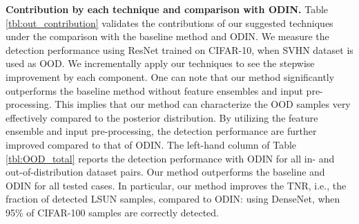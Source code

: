 \documentclass{article}
\begin{document}
{\bf Contribution by each technique and comparison with ODIN.} 
Table \ref{tbl:out_contribution} validates the contributions of our suggested techniques under the comparison with the baseline method and ODIN. 
We measure the detection performance using ResNet trained on CIFAR-10, when SVHN dataset is used as OOD.
We incrementally apply our techniques to see the stepwise improvement by each component.
One can note that our method significantly outperforms the baseline method without feature ensembles and input pre-processing.
This implies that our method can characterize the OOD samples very effectively compared to the posterior distribution. 
By utilizing the feature ensemble and input pre-processing,
the detection performance are further improved compared to that of ODIN.
The left-hand column of Table \ref{tbl:OOD_total} reports the detection performance with ODIN for all in- and out-of-distribution dataset pairs.
Our method outperforms the baseline and ODIN for all tested cases.
In particular, our method improves the TNR, i.e., the fraction of detected LSUN samples, compared to ODIN:  using DenseNet, when 95\% of CIFAR-100 samples are correctly detected.
\end{document}
